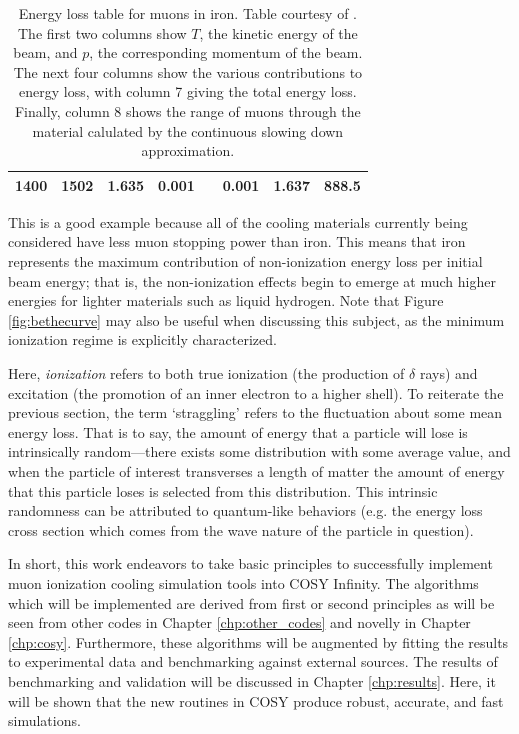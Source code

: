 \begin{table}
\begin{tabularx}{\textwidth}{cccccccc}
1400 & 1502 & 1.635  & 0.001 & & 0.001 	& 1.637 & 888.5\\
\hline
\end{tabularx}
\caption[Energy loss table for muons in iron. Table courtesy of \cite{PDGTables}.]{Energy loss table for muons in iron. Table courtesy of \cite{PDGTables}. The first two columns show $T$, the kinetic energy of the beam, and $p$, the corresponding momentum of the beam. The next four columns show the various contributions to energy loss, with column 7 giving the total energy loss. Finally, column 8 shows the range of muons through the material calulated by the continuous slowing down approximation.}
\label{tbl:elossfe}
\end{table}

This is a good example because all of the cooling materials currently being considered have less muon stopping power than iron. This means that iron represents the maximum contribution of non-ionization energy loss per initial beam energy; that is, the non-ionization effects begin to emerge at much higher energies for lighter materials such as liquid hydrogen. Note that Figure \ref{fig:bethecurve} may also be useful when discussing this subject, as the minimum ionization regime is explicitly characterized.

Here, \textit{ionization} refers to both true ionization (the production of $\delta$ rays) and excitation (the promotion of an inner electron to a higher shell). To reiterate the previous section, the term `straggling' refers to the fluctuation about some mean energy loss. That is to say, the amount of energy that a particle will lose is intrinsically random---there exists some distribution with some average value, and when the particle of interest transverses a length of matter the amount of energy that this particle loses is selected from this distribution. This intrinsic randomness can be attributed to quantum-like behaviors (e.g. the energy loss cross section which comes from the wave nature of the particle in question).

\par

In short, this work endeavors to take basic principles to successfully implement muon ionization cooling simulation tools into COSY Infinity. The algorithms which will be implemented are derived from first or second principles as will be seen from other codes in Chapter \ref{chp:other_codes} and novelly in Chapter \ref{chp:cosy}. Furthermore, these algorithms will be augmented by fitting the results to experimental data and benchmarking against external sources. The results of benchmarking and validation will be discussed in Chapter \ref{chp:results}. Here, it will be shown that the new routines in COSY produce robust, accurate, and fast simulations.